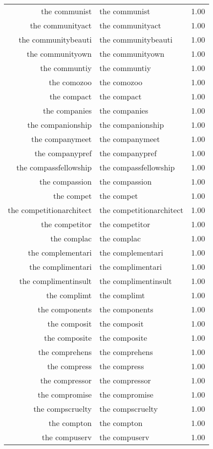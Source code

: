 \begin{table}[ht]
\begin{tabular}{rlr}
  the communist & the communist & 1.00 \\ 
  the communityact & the communityact & 1.00 \\ 
  the communitybeauti & the communitybeauti & 1.00 \\ 
  the communityown & the communityown & 1.00 \\ 
  the communtiy & the communtiy & 1.00 \\ 
  the comozoo & the comozoo & 1.00 \\ 
  the compact & the compact & 1.00 \\ 
  the companies & the companies & 1.00 \\ 
  the companionship & the companionship & 1.00 \\ 
  the companymeet & the companymeet & 1.00 \\ 
  the companypref & the companypref & 1.00 \\ 
  the compassfellowship & the compassfellowship & 1.00 \\ 
  the compassion & the compassion & 1.00 \\ 
  the compet & the compet & 1.00 \\ 
  the competitionarchitect & the competitionarchitect & 1.00 \\ 
  the competitor & the competitor & 1.00 \\ 
  the complac & the complac & 1.00 \\ 
  the complementari & the complementari & 1.00 \\ 
  the complimentari & the complimentari & 1.00 \\ 
  the complimentinsult & the complimentinsult & 1.00 \\ 
  the complimt & the complimt & 1.00 \\ 
  the components & the components & 1.00 \\ 
  the composit & the composit & 1.00 \\ 
  the composite & the composite & 1.00 \\ 
  the comprehens & the comprehens & 1.00 \\ 
  the compress & the compress & 1.00 \\ 
  the compressor & the compressor & 1.00 \\ 
  the compromise & the compromise & 1.00 \\ 
  the compscruelty & the compscruelty & 1.00 \\ 
  the compton & the compton & 1.00 \\ 
  the compuserv & the compuserv & 1.00 \\ 

\end{tabular}
\end{table}
